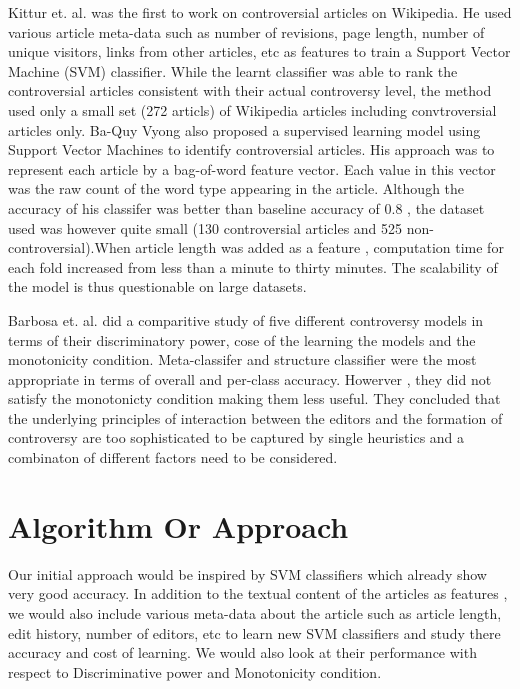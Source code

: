 \documentclass[twocolumn]{article}
\begin{document}
   Kittur et. al. was the first to work on controversial articles on
Wikipedia. He used various article meta-data such as number of
revisions, page length, number of unique visitors, links from other
articles, etc as features to train a Support Vector Machine (SVM)
classifier. While the learnt classifier was able to rank the
controversial articles consistent with their actual controversy level,
the method used only a small set (272 articls) of Wikipedia articles
including convtroversial articles only.  Ba-Quy Vyong also proposed a
supervised learning model using Support Vector Machines to identify
controversial articles. His approach was to represent each article by
a bag-of-word feature vector. Each value in this vector was the raw
count of the word type appearing in the article. Although the accuracy
of his classifer was better than baseline accuracy of 0.8 , the
dataset used was however quite small (130 controversial articles and
525 non-controversial).When article length was added as a feature ,
computation time for each fold increased from less than a minute to
thirty minutes. The scalability of the model is thus questionable on
large datasets.

   Barbosa et. al. did a comparitive study of five different
controversy models in terms of their discriminatory power, cose of the
learning the models and the monotonicity condition.  Meta-classifer
and structure classifier were the most appropriate in terms of overall
and per-class accuracy. Howerver , they did not satisfy the
monotonicty condition making them less useful. They concluded that the
underlying principles of interaction between the editors and the
formation of controversy are too sophisticated to be captured by
single heuristics and a combinaton of different factors need to be
considered.


 \section{Algorithm Or Approach}


   Our initial approach would be inspired by SVM classifiers which
already show very good accuracy. In addition to the textual content of
the articles as features , we would also include various meta-data
about the article such as article length, edit history, number of
editors, etc to learn new SVM classifiers and study there accuracy and
cost of learning. We would also look at their performance with respect
to Discriminative power and Monotonicity condition.
\end{document}
